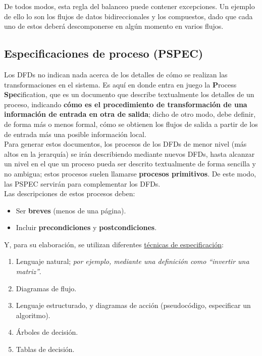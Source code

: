 De todos modos, esta regla del balanceo puede contener excepciones. Un ejemplo de ello lo son los flujos de datos bidireccionales y los compuestos, dado que cada uno de estos deberá descomponerse en algún momento en varios flujos.

\subsection{Especificaciones de proceso (PSPEC)}

Los DFDs no indican nada acerca de los detalles de cómo se realizan las transformaciones en el sistema. Es aquí en donde entra en juego la \textbf{P}rocess \textbf{Spec}ification, que es un documento que describe textualmente los detalles de un proceso, indicando \textbf{cómo es el procedimiento de transformación de una información de entrada en otra de salida}; dicho de otro modo, debe definir, de forma más o menos formal, cómo se obtienen los flujos de salida a partir de los de entrada más una posible información local.\\

Para generar estos documentos, los procesos de los DFDs de menor nivel (más altos en la jerarquía) se irán describiendo mediante nuevos DFDs, hasta alcanzar un nivel en el que un proceso pueda ser descrito textualmente de forma sencilla y no ambigua; estos procesos suelen llamarse \textbf{procesos primitivos}. De este modo, las PSPEC servirán para complementar los DFDs.\\

Las descripciones de estos procesos deben:

\begin{itemize}
    \item Ser \textbf{breves} (menos de una página).
    \item Incluir \textbf{precondiciones} y \textbf{postcondiciones}.
\end{itemize}

Y, para su elaboración, se utilizan diferentes \uline{técnicas de especificación}:

\begin{enumerate}
    \item Lenguaje natural; \textit{por ejemplo, mediante una definición como ``invertir una matriz''}.
    \item Diagramas de flujo.
    \item Lenguaje estructurado, y diagramas de acción (pseudocódigo, especificar un algoritmo). 
    \item Árboles de decisión.
    \item Tablas de decisión.
\end{enumerate}

